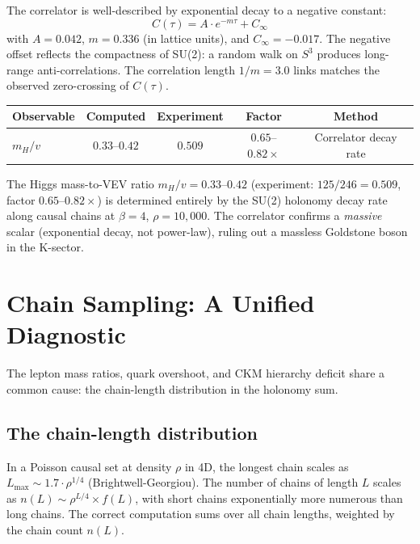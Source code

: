 \documentclass[11pt,letterpaper]{article}
\begin{document}
The correlator is well-described by exponential decay to a negative
constant:
\[
  C(\tau) = A \cdot e^{-m\tau} + C_\infty
\]
with $A = 0.042$, $m = 0.336$ (in lattice units), and $C_\infty =
-0.017$.  The negative offset reflects the compactness of SU(2): a
random walk on $S^3$ produces long-range anti-correlations.  The
correlation length $1/m = 3.0$ links matches the observed
zero-crossing of $C(\tau)$.

\begin{center}
\begin{tabular}{@{}lcccc@{}}
\toprule
Observable & Computed & Experiment & Factor & Method \\
\midrule
$m_H/v$ & $0.33$--$0.42$ & $0.509$ & $0.65$--$0.82\times$ &
  Correlator decay rate \\
\bottomrule
\end{tabular}
\end{center}

\noindent The Higgs mass-to-VEV ratio $m_H/v = 0.33$--$0.42$
(experiment: $125/246 = 0.509$, factor $0.65$--$0.82\times$) is
determined entirely by the SU(2) holonomy
decay rate along causal chains at $\beta = 4$, $\rho = 10{,}000$.
The correlator confirms a \emph{massive} scalar (exponential decay,
not power-law), ruling out a massless Goldstone boson in the
K-sector.

\section{Chain Sampling: A Unified Diagnostic}

The lepton mass ratios, quark overshoot, and CKM hierarchy deficit
share a common cause: the chain-length distribution in the holonomy
sum.

\subsection{The chain-length distribution}

In a Poisson causal set at density $\rho$ in 4D, the longest chain
scales as $L_{\max} \sim 1.7 \cdot \rho^{1/4}$ (Brightwell-Georgiou).
The number of chains of length $L$ scales as $n(L) \sim \rho^{L/4}
\times f(L)$, with short chains exponentially more numerous than long
chains. The correct computation sums over all chain lengths, weighted
by the chain count $n(L)$.
\end{document}
